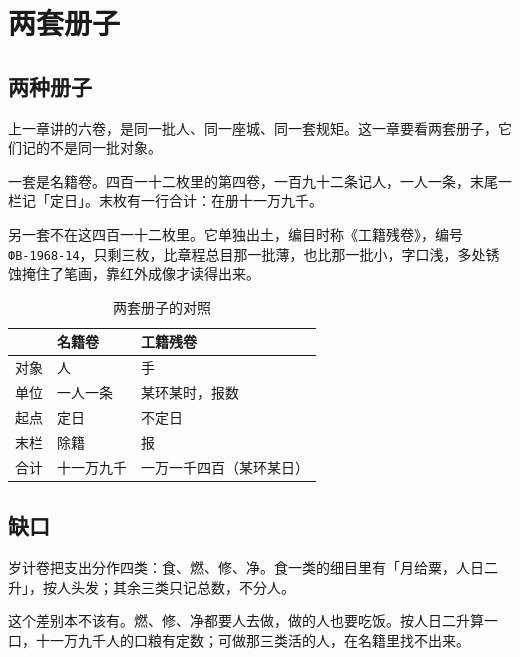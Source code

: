 \chapter{两套册子}


\section{两种册子}

上一章讲的六卷，是同一批人、同一座城、同一套规矩。这一章要看两套册子，它们记的不是同一批对象。

一套是名籍卷。四百一十二枚里的第四卷，一百九十二条记人，一人一条，末尾一栏记「定日」。末枚有一行合计：在册十一万九千。

另一套不在这四百一十二枚里。它单独出土，编目时称《工籍残卷》，编号 \texttt{ФВ-1968-14}，只剩三枚，比章程总目那一批薄，也比那一批小，字口浅，多处锈蚀掩住了笔画，靠红外成像才读得出来。

\begin{table}[htbp]
\centering
\caption{两套册子的对照}
\begin{tabular}{@{}lll@{}}
\toprule
 & 名籍卷 & 工籍残卷 \\
\midrule
对象 & 人 & 手 \\
单位 & 一人一条 & 某环某时，报数 \\
起点 & 定日 & 不定日 \\
末栏 & 除籍 & 报 \\
合计 & 十一万九千 & 一万一千四百（某环某日） \\
\bottomrule
\end{tabular}
\end{table}

\section{缺口}

岁计卷把支出分作四类：食、燃、修、净。食一类的细目里有「月给粟，人日二升」，按人头发；其余三类只记总数，不分人。

这个差别本不该有。燃、修、净都要人去做，做的人也要吃饭。按人日二升算一口，十一万九千人的口粮有定数；可做那三类活的人，在名籍里找不出来。

